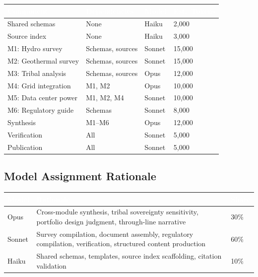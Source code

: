 \documentclass[11pt,letterpaper]{article}
\newcommand{\tableheader}[1]{\textbf{\sffamily\textcolor{white}{#1}}}
\begin{document}
\begin{center}
\begin{tabularx}{\textwidth}{L{3cm}L{2.5cm}C{1.5cm}C{2cm}}
\toprule
{}
\tableheader{Component} & \tableheader{Dependencies} & \tableheader{Model} & \tableheader{Est.\ Tokens} \\
\midrule
Shared schemas & None & Haiku & 2,000 \\
Source index & None & Haiku & 3,000 \\
M1: Hydro survey & Schemas, sources & Sonnet & 15,000 \\
M2: Geothermal survey & Schemas, sources & Sonnet & 15,000 \\
M3: Tribal analysis & Schemas, sources & Opus & 12,000 \\
M4: Grid integration & M1, M2 & Opus & 10,000 \\
M5: Data center power & M1, M2, M4 & Sonnet & 10,000 \\
M6: Regulatory guide & Schemas & Sonnet & 8,000 \\
Synthesis & M1--M6 & Opus & 12,000 \\
Verification & All & Sonnet & 5,000 \\
Publication & All & Sonnet & 5,000 \\
\bottomrule
\end{tabularx}
\end{center}

\subsection{Model Assignment Rationale}

\begin{center}
\begin{tabularx}{\textwidth}{C{1.5cm}XC{1.5cm}}
\toprule
{}
\tableheader{Model} & \tableheader{Rationale} & \tableheader{Share} \\
\midrule
Opus & Cross-module synthesis, tribal sovereignty sensitivity, portfolio design judgment, through-line narrative & 30\% \\
Sonnet & Survey compilation, document assembly, regulatory compilation, verification, structured content production & 60\% \\
Haiku & Shared schemas, templates, source index scaffolding, citation validation & 10\% \\
\bottomrule
\end{tabularx}
\end{center}
\end{document}
